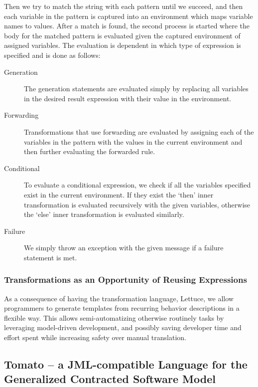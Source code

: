 Then we try to match the string with each pattern until we succeed,
and then each variable in the pattern is captured into an environment
which maps variable names to values.
After a match is found, the second process is started where the body
for the matched pattern is evaluated given the captured environment of assigned variables.
The evaluation is dependent in which type of expression is specified
and is done as follows:

\begin{description}
  \item[Generation] The generation statements are evaluated simply
    by replacing all variables in the desired result expression with their 
    value in the environment. 
  \item[Forwarding] Transformations that use forwarding are evaluated by
    assigning each of the variables in the pattern with the values in the
    current environment and then further evaluating the forwarded rule.
  \item[Conditional] To evaluate a conditional expression, we check if all
    the variables specified exist in the current environment.
    If they exist the `then' inner transformation is evaluated recursively
    with the given variables, otherwise the `else' inner transformation
    is evaluated similarly.
  \item[Failure] We simply throw an exception with the given message
    if a failure statement is met.
\end{description}

\subsubsection{Transformations as an Opportunity of Reusing Expressions}
\label{ssub:TransformationsasanOppurtunityofReusingExpressions}
As a consequence of having the transformation language, Lettuce,
we allow programmers to generate templates from recurring behavior descriptions in a flexible way. This allows semi-automatizing otherwise 
routinely tasks by leveraging model-driven development, and possibly saving developer time and effort spent while increasing safety over manual
translation.


\subsection{Tomato -- a JML-compatible Language for the Generalized Contracted Software Model}
\label{sub:Tomato-aJML-compatibleLanguagefortheGeneralizedContractedSoftwareModel}


